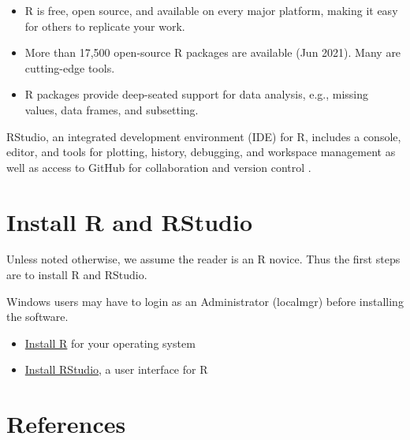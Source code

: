 \documentclass[
]{book}
\providecommand{\tightlist}{%
  \setlength{\itemsep}{0pt}\setlength{\parskip}{0pt}}
\begin{document}
\begin{itemize}
\tightlist
\item
  R is free, open source, and available on every major platform, making it easy for others to replicate your work.
\item
  More than 17,500 open-source R packages are available (Jun 2021). Many are cutting-edge tools.
\item
  R packages provide deep-seated support for data analysis, e.g., missing values, data frames, and subsetting.
\end{itemize}

RStudio, an integrated development environment (IDE) for R, includes a console, editor, and tools for plotting, history, debugging, and workspace management as well as access to GitHub for collaboration and version control \citep{2016rstudio}.

\hypertarget{install-R-and-RStudio}{%
\section*{Install R and RStudio}\label{install-R-and-RStudio}}

Unless noted otherwise, we assume the reader is an R novice. Thus the first steps are to install R and RStudio.

Windows users may have to login as an Administrator (localmgr) before installing the software.

\begin{itemize}
\tightlist
\item
  \href{https://cloud.r-project.org}{Install R} for your operating system\\
\item
  \href{https://www.rstudio.com/products/rstudio/\#Desktop}{Install RStudio}, a user interface for R
\end{itemize}

\hypertarget{references}{%
\section*{References}\label{references}}

  
\end{document}
